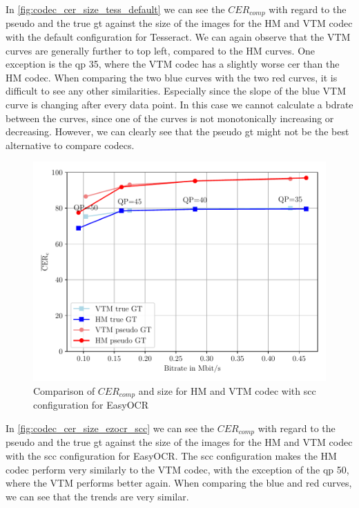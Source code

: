 In \autoref{fig:codec_cer_size_tess_default} we can see the $CER_{comp}$ with regard to the pseudo and the true \gls{gt} against the size of the images for the HM and VTM codec with the default configuration for Tesseract.
We can again observe that the VTM curves are generally further to top left, compared to the HM curves.
One exception is the \gls{qp} 35, where the VTM codec has a slightly worse \gls{cer} than the HM codec.
When comparing the two blue curves with the two red curves, it is difficult to see any other similarities.
Especially since the slope of the blue VTM curve is changing after every data point.
In this case we cannot calculate a \gls{bdrate} between the curves, since one of the curves is not monotonically increasing or decreasing.
However, we can clearly see that the pseudo \gls{gt} might not be the best alternative to compare codecs.


\begin{figure}[h]
    \centering
    \includegraphics[width=\textwidth]{../images/analyze/codec_cer_size_ezocr_scc.pdf}
    \caption{Comparison of $CER_{comp}$ and size for HM and VTM codec with \gls{scc} configuration for EasyOCR}
    \label{fig:codec_cer_size_ezocr_scc}
\end{figure}

In \autoref{fig:codec_cer_size_ezocr_scc} we can see the $CER_{comp}$ with regard to the pseudo and the true \gls{gt} against the size of the images for the HM and VTM codec with the \gls{scc} configuration for EasyOCR.
The \gls{scc} configuration makes the HM codec perform very similarly to the VTM codec, with the exception of the \gls{qp} 50, where the VTM performs better again.
When comparing the blue and red curves, we can see that the trends are very similar.


